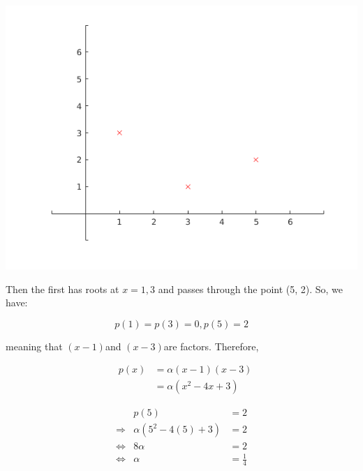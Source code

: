 \documentclass[MathsNotesBase.tex]{subfiles}
\begin{document}
{	\begin{center}
	\includegraphics[width=\linewidth]{figure_0.png}
	\end{center}
	
	
	\begin{par}
	\begin{flushleft}
	Then the first has roots at $x=1,3$ and passes through the point (5, 2). So, we have:
	\end{flushleft}
	\end{par}
	
	\begin{par}
	$$p(1)=p(3)=0, p(5) = 2$$
	\end{par}
	
	\begin{par}
	\begin{flushleft}
	meaning that $\left(x-1\right)$and $\left(x-3\right)$are factors. Therefore,
	\end{flushleft}
	\end{par}
	
	\begin{par}
	$$\begin{array}{lcr}
	&p(x) &= \alpha(x-1)(x-3)\\
	&&= \alpha(x^2-4x+3)
	\end{array}$$
	\end{par}
	
	\begin{par}
	$$\begin{array}{lcr}
	&p(5)&=2 \\
	\Longrightarrow &\alpha(5^2-4(5) + 3) &= 2 \\
	\iff &8\alpha&=2\\
	\iff &\alpha &= \frac{1}{4}\\
	\end{array}$$
	\end{par}
	
}
\end{document}
